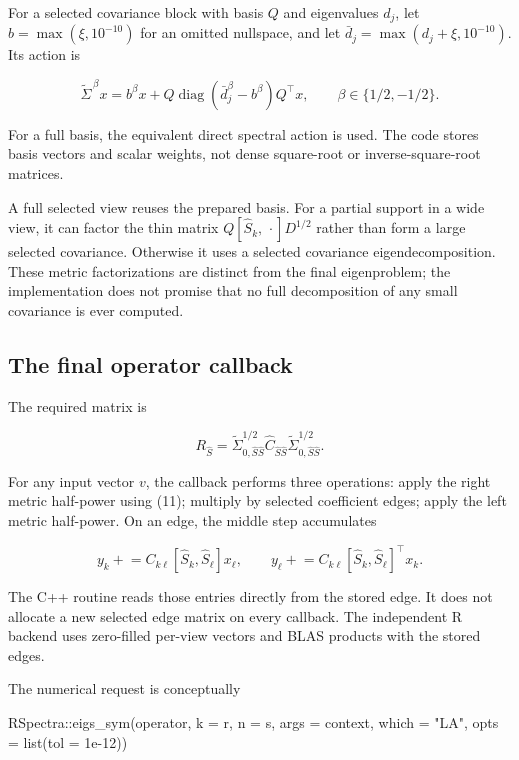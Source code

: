 \documentclass[
  11pt,
]{article}
\newenvironment{Shaded}{}{}
\newcommand{\AttributeTok}[1]{\textcolor[rgb]{0.49,0.56,0.16}{#1}}
\newcommand{\FloatTok}[1]{\textcolor[rgb]{0.25,0.63,0.44}{#1}}
\newcommand{\FunctionTok}[1]{\textcolor[rgb]{0.02,0.16,0.49}{#1}}
\newcommand{\NormalTok}[1]{#1}
\newcommand{\SpecialCharTok}[1]{\textcolor[rgb]{0.25,0.44,0.63}{#1}}
\newcommand{\StringTok}[1]{\textcolor[rgb]{0.25,0.44,0.63}{#1}}
\begin{document}
For a selected covariance block with basis \(Q\) and eigenvalues
\(d_j\), let \(b=\max(\xi,10^{-10})\) for an omitted nullspace, and let
\(\bar d_j=\max(d_j+\xi,10^{-10})\). Its action is

\[
\widetilde\Sigma^{\,\beta}x
=b^\beta x+Q\operatorname{diag}(\bar d_j^\beta-b^\beta)Q^\top x,
\qquad \beta\in\{1/2,-1/2\}.
\tag{11}
\]

For a full basis, the equivalent direct spectral action is used. The
code stores basis vectors and scalar weights, not dense square-root or
inverse-square-root matrices.

A full selected view reuses the prepared basis. For a partial support in
a wide view, it can factor the thin matrix
\(Q[\widehat S_k,\,\cdot]D^{1/2}\) rather than form a large selected
covariance. Otherwise it uses a selected covariance eigendecomposition.
These metric factorizations are distinct from the final eigenproblem;
the implementation does not promise that no full decomposition of any
small covariance is ever computed.

\hypertarget{the-final-operator-callback}{%
\subsection{The final operator
callback}\label{the-final-operator-callback}}

The required matrix is

\[
R_{\widehat S}
=\widetilde\Sigma_{0,\widehat S\widehat S}^{1/2}
 \widehat C_{\widehat S\widehat S}
 \widetilde\Sigma_{0,\widehat S\widehat S}^{1/2}.
\]

For any input vector \(v\), the callback performs three operations:
apply the right metric half-power using (11); multiply by selected
coefficient edges; apply the left metric half-power. On an edge, the
middle step accumulates

\[
y_k\mathrel{+}=C_{k\ell}[\widehat S_k,\widehat S_\ell]x_\ell,
\qquad
y_\ell\mathrel{+}=C_{k\ell}[\widehat S_k,\widehat S_\ell]^\top x_k.
\tag{12}
\]

The C++ routine reads those entries directly from the stored edge. It
does not allocate a new selected edge matrix on every callback. The
independent R backend uses zero-filled per-view vectors and BLAS
products with the stored edges.

The numerical request is conceptually

\begin{Shaded}
\begin{Highlighting}[]
\NormalTok{RSpectra}\SpecialCharTok{::}\FunctionTok{eigs\_sym}\NormalTok{(operator, }\AttributeTok{k =}\NormalTok{ r, }\AttributeTok{n =}\NormalTok{ s, }\AttributeTok{args =}\NormalTok{ context,}
                  \AttributeTok{which =} \StringTok{"LA"}\NormalTok{, }\AttributeTok{opts =} \FunctionTok{list}\NormalTok{(}\AttributeTok{tol =} \FloatTok{1e{-}12}\NormalTok{))}
\end{Highlighting}
\end{Shaded}
\end{document}
